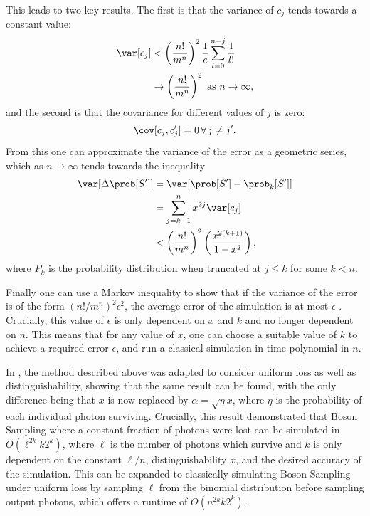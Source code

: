 This leads to two key results. The first is that the variance of $c_j$ tends towards a constant value:
\begin{align}
\var[c_j] &< \left(\frac{n!}{m^n}\right)^2\frac{1}{e}\sum_{l=0}^{n-j}\frac{1}{l!} \label{eqn:var}\\
&\rightarrow\left(\frac{n!}{m^n}\right)^2 \textrm{ as } n\rightarrow\infty,
\end{align}
and the second is that the covariance for different values of $j$ is zero:
\begin{equation}
\cov[c_j,c_j'] = 0\, \forall\, j\neq j'\label{eqn:covar}.
\end{equation}
From this one can approximate the variance of the error as a geometric series, which as $n\rightarrow\infty$ tends towards the inequality
\begin{align}
\var[\Delta \prob[S']] &= \var[\prob[S']-\prob_k[S']]\\
&= \sum_{j=k+1}^nx^{2j}\var[c_j]\label{eqn:renema-variance}\\
&< \left(\frac{n!}{m^n}\right)^2\left(\frac{x^{2(k+1)}}{1-x^2}\right),
\end{align}
\noindent where $P_k$ is the probability distribution when truncated at $j\leq k$ for some $k<n$.

Finally one can use a Markov inequality to show that if the variance of the error is of the form $(n!/m^n)^2\epsilon^2$, the average error of the simulation is at most $\epsilon$ \cite{renema2018loss}.
Crucially, this value of $\epsilon$ is only dependent on $x$ and $k$ and no longer dependent on $n$.
This means that for any value of $x$, one can choose a suitable value of $k$ to achieve a required error $\epsilon$, and run a classical simulation in time polynomial in $n$.

In \cite{renema2018loss}, the method described above was adapted to consider uniform loss as well as distinguishability, showing that the same result can be found, with the only difference being that $x$ is now replaced by $\alpha=\sqrt{\eta}x$, where $\eta$ is the probability of each individual photon surviving. 
Crucially, this result demonstrated that Boson Sampling where a constant fraction of photons were lost can be simulated in $O(\ell^{2k}k2^k)$, where $\ell$ is the number of photons which survive and $k$ is only dependent on the constant $\ell/n$, distinguishability $x$, and the desired accuracy of the simulation. 
This can be expanded to classically simulating Boson Sampling under uniform loss by sampling $\ell$ from the binomial distribution before sampling output photons, which offers a runtime of $O(n^{2k}k2^k)$. 

